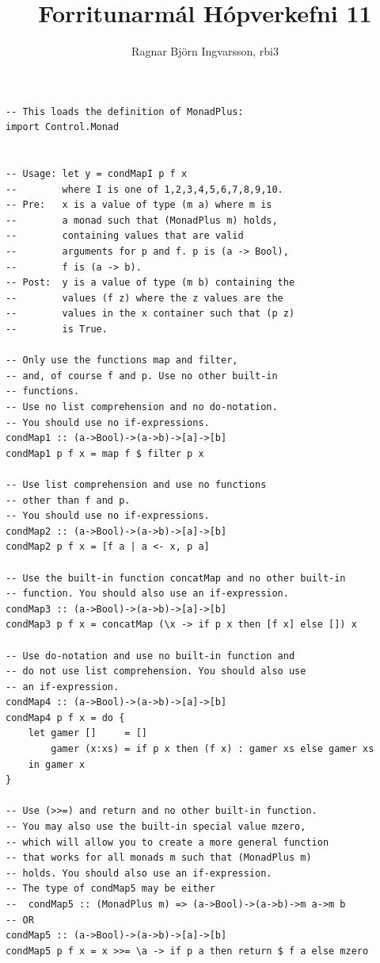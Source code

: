 \documentclass{article}
\title{Forritunarmál Hópverkefni 11}
\author{Ragnar Björn Ingvarsson, rbi3}
\begin{document}
\renewcommand\thepage{}

	\maketitle

	\newpage
	\setcounter{page}{1}
	\renewcommand\thepage{\arabic{page}}

	\section{}
	\begin{verbatim}
-- This loads the definition of MonadPlus:
import Control.Monad


-- Usage: let y = condMapI p f x
--        where I is one of 1,2,3,4,5,6,7,8,9,10.
-- Pre:   x is a value of type (m a) where m is
--        a monad such that (MonadPlus m) holds,
--        containing values that are valid
--        arguments for p and f. p is (a -> Bool),
--        f is (a -> b).
-- Post:  y is a value of type (m b) containing the
--        values (f z) where the z values are the
--        values in the x container such that (p z)
--        is True.

-- Only use the functions map and filter,
-- and, of course f and p. Use no other built-in
-- functions.
-- Use no list comprehension and no do-notation.
-- You should use no if-expressions.
condMap1 :: (a->Bool)->(a->b)->[a]->[b]
condMap1 p f x = map f $ filter p x

-- Use list comprehension and use no functions
-- other than f and p.
-- You should use no if-expressions.
condMap2 :: (a->Bool)->(a->b)->[a]->[b]
condMap2 p f x = [f a | a <- x, p a]

-- Use the built-in function concatMap and no other built-in
-- function. You should also use an if-expression.
condMap3 :: (a->Bool)->(a->b)->[a]->[b]
condMap3 p f x = concatMap (\x -> if p x then [f x] else []) x

-- Use do-notation and use no built-in function and
-- do not use list comprehension. You should also use
-- an if-expression.
condMap4 :: (a->Bool)->(a->b)->[a]->[b]
condMap4 p f x = do {
    let gamer []     = []
        gamer (x:xs) = if p x then (f x) : gamer xs else gamer xs
    in gamer x
}

-- Use (>>=) and return and no other built-in function.
-- You may also use the built-in special value mzero,
-- which will allow you to create a more general function
-- that works for all monads m such that (MonadPlus m)
-- holds. You should also use an if-expression.
-- The type of condMap5 may be either
--  condMap5 :: (MonadPlus m) => (a->Bool)->(a->b)->m a->m b
-- OR
condMap5 :: (a->Bool)->(a->b)->[a]->[b]
condMap5 p f x = x >>= \a -> if p a then return $ f a else mzero


\end{verbatim}
\end{document}
